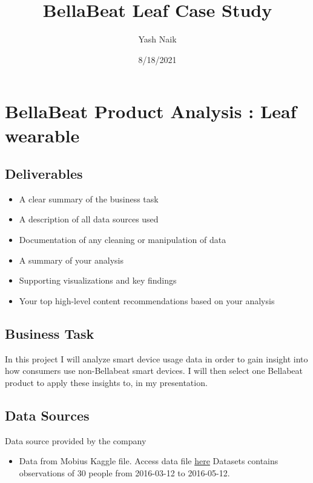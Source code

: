 \documentclass[
]{article}
\title{BellaBeat Leaf Case Study}
\author{Yash Naik}
\date{8/18/2021}
\providecommand{\tightlist}{%
  \setlength{\itemsep}{0pt}\setlength{\parskip}{0pt}}
\begin{document}
\maketitle

\hypertarget{bellabeat-product-analysis-leaf-wearable}{%
\section{BellaBeat Product Analysis : Leaf
wearable}\label{bellabeat-product-analysis-leaf-wearable}}

\hypertarget{deliverables}{%
\subsection{Deliverables}\label{deliverables}}

\begin{itemize}
\tightlist
\item
  A clear summary of the business task
\item
  A description of all data sources used
\item
  Documentation of any cleaning or manipulation of data
\item
  A summary of your analysis
\item
  Supporting visualizations and key findings
\item
  Your top high-level content recommendations based on your analysis
\end{itemize}

\hypertarget{business-task}{%
\subsection{Business Task}\label{business-task}}

In this project I will analyze smart device usage data in order to gain
insight into how consumers use non-Bellabeat smart devices. I will then
select one Bellabeat product to apply these insights to, in my
presentation.

\hypertarget{data-sources}{%
\subsection{Data Sources}\label{data-sources}}

Data source provided by the company

\begin{itemize}
\tightlist
\item
  Data from Mobius Kaggle file. Access data file
  \href{https://www.kaggle.com/arashnic/fitbit}{here} Datasets contains
  observations of 30 people from 2016-03-12 to 2016-05-12.
\end{itemize}
\end{document}
